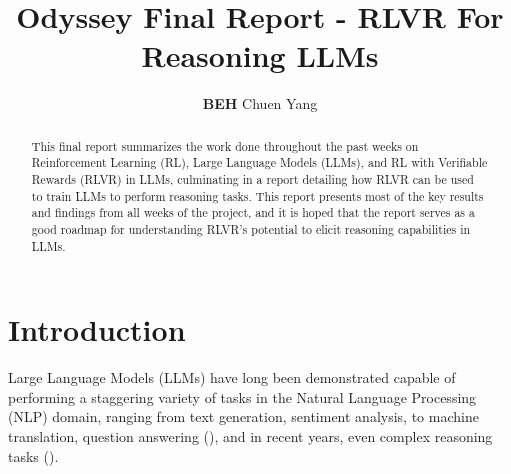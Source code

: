 \documentclass{article} %
\title{Odyssey Final Report - RLVR For Reasoning LLMs}
\author{\textbf{BEH} Chuen Yang}
\theoremstyle{definition}
\begin{document}
\ifcolmsubmission
\linenumbers
\fi

\maketitle


\begin{abstract}
    This final report summarizes the work done throughout the past weeks on Reinforcement Learning (RL), Large Language Models (LLMs),
    and RL with Verifiable Rewards (RLVR) in LLMs, culminating in a report detailing
    how RLVR can be used to train LLMs to perform reasoning tasks.
    This report presents most of the key results and findings from all weeks of the project, and it is hoped
    that the report serves as a good roadmap for understanding RLVR's potential to elicit reasoning capabilities in LLMs.
\end{abstract}

\section{Introduction}
Large Language Models (LLMs) have long been demonstrated capable of performing a staggering variety of tasks
in the Natural Language Processing (NLP) domain, ranging from text generation, 
sentiment analysis, to machine translation, question answering (\cite{Brown-et-al-2020}),
and in recent years, even complex reasoning tasks (\cite{tulu3, grpo, r1}).
\end{document}
